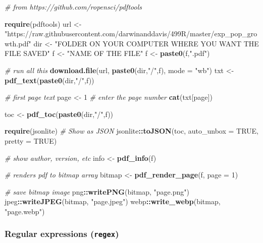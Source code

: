 \documentclass[10,portrait]{article}
\newenvironment{Shaded}{\begin{snugshade}}{\end{snugshade}}
\newcommand{\KeywordTok}[1]{\textcolor[rgb]{0.13,0.29,0.53}{\textbf{#1}}}
\newcommand{\DataTypeTok}[1]{\textcolor[rgb]{0.13,0.29,0.53}{#1}}
\newcommand{\DecValTok}[1]{\textcolor[rgb]{0.00,0.00,0.81}{#1}}
\newcommand{\StringTok}[1]{\textcolor[rgb]{0.31,0.60,0.02}{#1}}
\newcommand{\CommentTok}[1]{\textcolor[rgb]{0.56,0.35,0.01}{\textit{#1}}}
\newcommand{\OtherTok}[1]{\textcolor[rgb]{0.56,0.35,0.01}{#1}}
\newcommand{\OperatorTok}[1]{\textcolor[rgb]{0.81,0.36,0.00}{\textbf{#1}}}
\newcommand{\NormalTok}[1]{#1}
\begin{document}
\begin{Shaded}
\begin{Highlighting}[]
\CommentTok{# from https://github.com/ropensci/pdftools}

\KeywordTok{require}\NormalTok{(pdftools)}
\NormalTok{url <-}\StringTok{ "https://raw.githubusercontent.com/darwinanddavis/499R/master/exp_pop_growth.pdf"}
\NormalTok{dir <-}\StringTok{ "FOLDER ON YOUR COMPUTER WHERE YOU WANT THE FILE SAVED"}
\NormalTok{f <-}\StringTok{ "NAME OF THE FILE"} 
\NormalTok{f <-}\StringTok{ }\KeywordTok{paste0}\NormalTok{(f,}\StringTok{".pdf"}\NormalTok{) }

\CommentTok{# run all this}
\KeywordTok{download.file}\NormalTok{(url, }\KeywordTok{paste0}\NormalTok{(dir,}\StringTok{"/"}\NormalTok{,f), }\DataTypeTok{mode =} \StringTok{"wb"}\NormalTok{)}
\NormalTok{txt <-}\StringTok{ }\KeywordTok{pdf_text}\NormalTok{(}\KeywordTok{paste0}\NormalTok{(dir,}\StringTok{"/"}\NormalTok{,f))}

\CommentTok{# first page text}
\NormalTok{page <-}\StringTok{ }\DecValTok{1} \CommentTok{# enter the page number}
\KeywordTok{cat}\NormalTok{(txt[page])}

\NormalTok{toc <-}\StringTok{ }\KeywordTok{pdf_toc}\NormalTok{(}\KeywordTok{paste0}\NormalTok{(dir,}\StringTok{"/"}\NormalTok{,f))}

\KeywordTok{require}\NormalTok{(jsonlite)}
\CommentTok{# Show as JSON}
\NormalTok{jsonlite}\OperatorTok{::}\KeywordTok{toJSON}\NormalTok{(toc, }\DataTypeTok{auto_unbox =} \OtherTok{TRUE}\NormalTok{, }\DataTypeTok{pretty =} \OtherTok{TRUE}\NormalTok{)}

\CommentTok{# show author, version, etc}
\NormalTok{info <-}\StringTok{ }\KeywordTok{pdf_info}\NormalTok{(f)}

\CommentTok{# renders pdf to bitmap array}
\NormalTok{bitmap <-}\StringTok{ }\KeywordTok{pdf_render_page}\NormalTok{(f, }\DataTypeTok{page =} \DecValTok{1}\NormalTok{)}

\CommentTok{# save bitmap image}
\NormalTok{png}\OperatorTok{::}\KeywordTok{writePNG}\NormalTok{(bitmap, }\StringTok{"page.png"}\NormalTok{)}
\NormalTok{jpeg}\OperatorTok{::}\KeywordTok{writeJPEG}\NormalTok{(bitmap, }\StringTok{"page.jpeg"}\NormalTok{)}
\NormalTok{webp}\OperatorTok{::}\KeywordTok{write_webp}\NormalTok{(bitmap, }\StringTok{"page.webp"}\NormalTok{)}
\end{Highlighting}
\end{Shaded}

\subsubsection{\texorpdfstring{Regular expressions
(\texttt{regex})}{Regular expressions (regex)}}\label{regular-expressions-regex}
\end{document}
